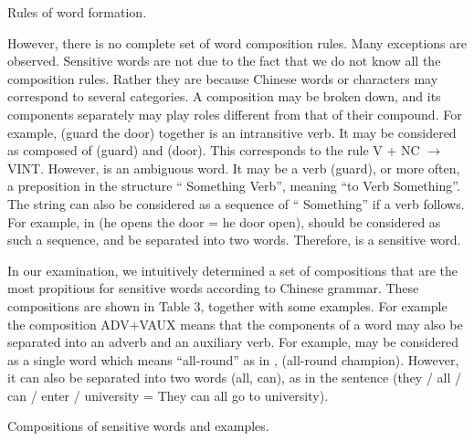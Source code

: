 \begin{table}
\caption{Rules of word formation.}
\label{RULES}
\medskip
\begin{center}
\end{center}
\end{table}

However, there is no complete set of word composition rules. Many exceptions are observed. Sensitive words are not 
due to the fact that we do not know all the composition rules. Rather they are because Chinese words or characters may 
correspond to several categories. A composition may be broken down, and its components separately may play roles 
different from that of their compound. For example,  (guard the door) together is an intransitive verb. It may be 
considered as composed of  (guard) and   (door). This corresponds to the rule V + NC $\rightarrow$  VINT. However,  
is an ambiguous word. It may be a verb (guard), or more often, a preposition in the structure `` Something Verb'', 
meaning ``to Verb Something''. The string  can also be considered as a sequence of `` Something'' if a verb 
follows. For example, in  (he opens the door = he  door open),  should be considered as 
such a sequence, and be separated into two words. Therefore,  is a sensitive word. 

In our examination, we intuitively determined a set of compositions that are the most propitious for sensitive words 
according to Chinese grammar. These compositions are shown in Table 3, together with some examples. For example 
the composition ADV+VAUX means that the components of a word may also be separated into an adverb and an 
auxiliary verb. For example,  may be considered as a single word which means ``all-round'' as in , (all-round 
champion). However, it can also be separated into two words (all, can), as in the sentence  (they / all / can / enter / university = They can all go to university). 

\begin{table}
\caption{Compositions of sensitive words and examples.}
\label{EXAMPLES}
\medskip
{}
\end{table}

